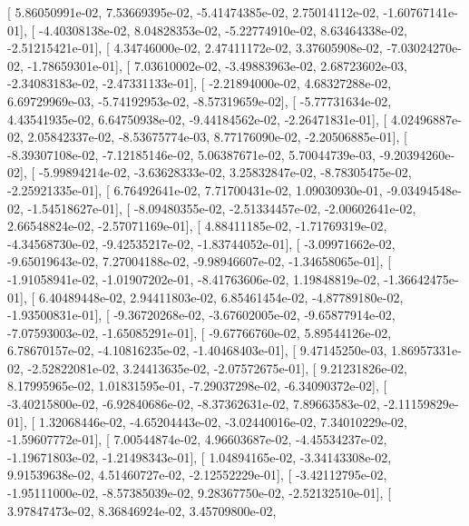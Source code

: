 \documentclass{article}
\begin{document}
       [  5.86050991e-02,   7.53669395e-02,  -5.41474385e-02,
          2.75014112e-02,  -1.60767141e-01],
       [ -4.40308138e-02,   8.04828353e-02,  -5.22774910e-02,
          8.63464338e-02,  -2.51215421e-01],
       [  4.34746000e-02,   2.47411172e-02,   3.37605908e-02,
         -7.03024270e-02,  -1.78659301e-01],
       [  7.03610002e-02,  -3.49883963e-02,   2.68723602e-03,
         -2.34083183e-02,  -2.47331133e-01],
       [ -2.21894000e-02,   4.68327288e-02,   6.69729969e-03,
         -5.74192953e-02,  -8.57319659e-02],
       [ -5.77731634e-02,   4.43541935e-02,   6.64750938e-02,
         -9.44184562e-02,  -2.26471831e-01],
       [  4.02496887e-02,   2.05842337e-02,  -8.53675774e-03,
          8.77176090e-02,  -2.20506885e-01],
       [ -8.39307108e-02,  -7.12185146e-02,   5.06387671e-02,
          5.70044739e-03,  -9.20394260e-02],
       [ -5.99894214e-02,  -3.63628333e-02,   3.25832847e-02,
         -8.78305475e-02,  -2.25921335e-01],
       [  6.76492641e-02,   7.71700431e-02,   1.09030930e-01,
         -9.03494548e-02,  -1.54518627e-01],
       [ -8.09480355e-02,  -2.51334457e-02,  -2.00602641e-02,
          2.66548824e-02,  -2.57071169e-01],
       [  4.88411185e-02,  -1.71769319e-02,  -4.34568730e-02,
         -9.42535217e-02,  -1.83744052e-01],
       [ -3.09971662e-02,  -9.65019643e-02,   7.27004188e-02,
         -9.98946607e-02,  -1.34658065e-01],
       [ -1.91058941e-02,  -1.01907202e-01,  -8.41763606e-02,
          1.19848819e-02,  -1.36642475e-01],
       [  6.40489448e-02,   2.94411803e-02,   6.85461454e-02,
         -4.87789180e-02,  -1.93500831e-01],
       [ -9.36720268e-02,  -3.67602005e-02,  -9.65877914e-02,
         -7.07593003e-02,  -1.65085291e-01],
       [ -9.67766760e-02,   5.89544126e-02,   6.78670157e-02,
         -4.10816235e-02,  -1.40468403e-01],
       [  9.47145250e-03,   1.86957331e-02,  -2.52822081e-02,
          3.24413635e-02,  -2.07572675e-01],
       [  9.21231826e-02,   8.17995965e-02,   1.01831595e-01,
         -7.29037298e-02,  -6.34090372e-02],
       [ -3.40215800e-02,  -6.92840686e-02,  -8.37362631e-02,
          7.89663583e-02,  -2.11159829e-01],
       [  1.32068446e-02,  -4.65204443e-02,  -3.02440016e-02,
          7.34010229e-02,  -1.59607772e-01],
       [  7.00544874e-02,   4.96603687e-02,  -4.45534237e-02,
         -1.19671803e-02,  -1.21498343e-01],
       [  1.04894165e-02,  -3.34143308e-02,   9.91539638e-02,
          4.51460727e-02,  -2.12552229e-01],
       [ -3.42112795e-02,  -1.95111000e-02,  -8.57385039e-02,
          9.28367750e-02,  -2.52132510e-01],
       [  3.97847473e-02,   8.36846924e-02,   3.45709800e-02,
\end{document}
